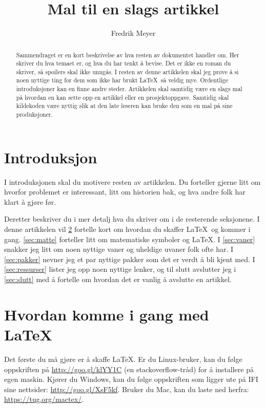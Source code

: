 \documentclass[a4paper, norsk]{article}  %
\title{Mal til en slags artikkel}
\author{Fredrik Meyer}
\begin{document}
\maketitle 

\begin{abstract}
\noindent
Sammendraget er en kort beskrivelse av hva resten av dokumentet handler om. Her skriver du hva temaet er, og hva du har tenkt å bevise. Det er ikke en roman du skriver, så spoilers skal ikke unngås. I resten av denne artikkelen skal jeg prøve å si noen nyttige ting for dem som ikke har brukt \LaTeX\ så veldig mye. Ordentlige introduksjoner kan en finne andre steder. Artikkelen skal samtidig være en slags mal på hvordan en kan sette opp en artikkel eller en prosjektoppgave. Samtidig skal kildekoden være nyttig slik at den late leseren kan bruke den som en mal på sine produksjoner.
\end{abstract}

\section{Introduksjon}

I introduksjonen skal du motivere resten av artikkelen. Du forteller gjerne litt om hvorfor problemet er interessant, litt om historien bak, og hva andre folk har klart å gjøre før.

Deretter beskriver du i mer detalj hva du skriver om i de resterende seksjonene. I denne artikkelen vil \cref{sec:intro} fortelle kort om hvordan du skaffer \LaTeX\ og kommer i gang. \cref{sec:matte} forteller litt om matematiske symboler og \LaTeX. I \cref{sec:vaner} snakker jeg litt om noen nyttige vaner og uheldige uvaner folk ofte har. I \cref{sec:pakker} nevner jeg et par nyttige pakker som det er verdt å bli kjent med. I \cref{sec:ressurser} lister jeg opp noen nyttige lenker, og til slutt avslutter jeg i \cref{sec:slutt} med å fortelle om hvordan det er vanlig å avslutte en artikkel.

\section{Hvordan komme i gang med \LaTeX}
\label{sec:intro}

Det første du må gjøre er å skaffe \LaTeX. Er du Linux-bruker, kan du følge oppskriften på \url{http://goo.gl/klYY1C} (en stackoverflow-tråd) for å installere på egen maskin. Kjører du Windows, kan du følge oppskriften som ligger ute på IFI sine nettsider: \url{http://goo.gl/XsF5kf}. Bruker du Mac, kan du laste ned herfra: \url{https://tug.org/mactex/}.
\end{document}
